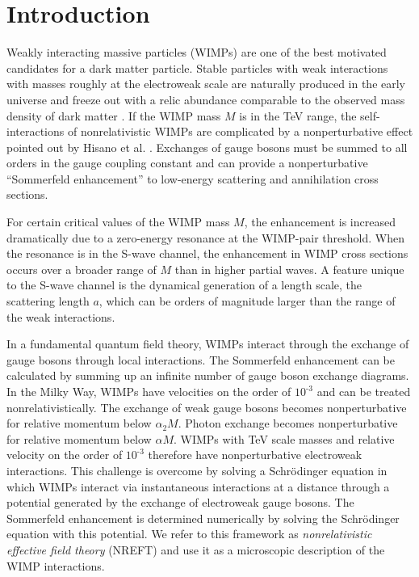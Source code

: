 \documentclass[%
 reprint,
 amsmath,amssymb,
 aps,
]{revtex4-1}
\begin{document}
\maketitle


\section{Introduction}
\label{sec:Introduction}

Weakly interacting massive particles (WIMPs) are one of the best motivated candidates for a dark matter particle. 
Stable particles with weak interactions with masses roughly at the electroweak scale are naturally produced in the early universe and freeze out with a relic abundance comparable to the observed mass density of dark matter \cite{Kolb:1990vq,Steigman:2012nb}.
If the WIMP mass $M$ is in the TeV range, the self-interactions of nonrelativistic WIMPs are complicated by a nonperturbative effect pointed out by Hisano et al. \cite{Hisano:2002fk}.
Exchanges of gauge bosons must be summed to all orders in the gauge coupling constant and can provide a nonperturbative ``Sommerfeld enhancement'' to low-energy scattering and annihilation cross sections.

For certain critical values of the WIMP mass $M$, the enhancement is increased dramatically due to a zero-energy resonance at the WIMP-pair threshold.
When the resonance is in the S-wave channel, the enhancement in WIMP cross sections occurs over a broader range of $M$ than in higher partial waves.
A feature unique to the S-wave channel is the dynamical generation of a length scale, the scattering length $a$, which can be orders of magnitude larger than the range of the weak interactions.

In a fundamental quantum field theory, WIMPs interact through the exchange of gauge bosons through local interactions.
The Sommerfeld enhancement can be calculated by summing up an infinite number of gauge boson exchange diagrams.
In the Milky Way, WIMPs have velocities on the order of $10^{\text{-}3}$ and can be treated nonrelativistically.
The exchange of weak gauge bosons becomes nonperturbative for relative momentum below $\alpha_2 M$.
Photon exchange becomes nonperturbative for relative momentum below $\alpha M$.
WIMPs with TeV scale masses and relative velocity on the order of $10^{\text{-}3}$ therefore have nonperturbative electroweak interactions.
This challenge is overcome by solving a Schr\"odinger equation in which WIMPs interact via instantaneous interactions at a distance through a potential generated by the exchange of electroweak gauge bosons.
The Sommerfeld enhancement is determined numerically by solving the Schr\"odinger equation with this potential.
We refer to this framework as {\it nonrelativistic effective field theory} (NREFT) and use it as a microscopic description of the WIMP interactions.
\end{document}
